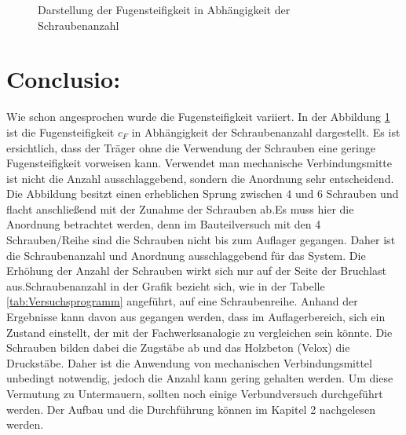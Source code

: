 \begin{figure}[h!]
\begin{center}
\caption{Darstellung der Fugensteifigkeit in Abhängigkeit der Schraubenanzahl}
\label{Fugensteifigkeit-Schraubenanzahl}
\end{center}
\end{figure}




\section{Conclusio:} Wie schon angesprochen wurde die Fugensteifigkeit variiert. In der Abbildung
\ref{Fugensteifigkeit-Schraubenanzahl} ist die Fugensteifigkeit $c_{F}$ in Abhängigkeit der Schraubenanzahl dargestellt.
Es ist ersichtlich, dass der Träger ohne die Verwendung der Schrauben eine geringe
Fugensteifigkeit vorweisen kann. Verwendet man mechanische Verbindungsmitte ist nicht die Anzahl ausschlaggebend, sondern die Anordnung sehr entscheidend. Die Abbildung besitzt einen erheblichen Sprung zwischen 4
und 6 Schrauben und flacht anschließend mit der Zunahme der Schrauben ab.Es muss hier die Anordnung betrachtet werden, denn im Bauteilversuch mit den 4 Schrauben/Reihe sind die Schrauben nicht bis zum Auflager gegangen. Daher ist die Schraubenanzahl und Anordnung ausschlaggebend für das System. Die Erhöhung der
Anzahl der Schrauben wirkt sich nur auf der Seite der Bruchlast aus.Schraubenanzahl
in der Grafik bezieht sich, wie in der Tabelle \ref{tab:Versuchsprogramm} angeführt, auf eine Schraubenreihe.
Anhand der Ergebnisse kann davon aus gegangen werden, dass im Auflagerbereich, sich
ein Zustand einstellt, der mit der Fachwerksanalogie zu vergleichen sein könnte. Die
Schrauben bilden dabei die Zugstäbe ab und das Holzbeton (Velox) die Druckstäbe. Daher ist die
Anwendung von mechanischen Verbindungsmittel unbedingt notwendig, jedoch die Anzahl kann gering gehalten werden. Um
diese Vermutung zu Untermauern, sollten noch einige Verbundversuch durchgeführt werden. Der Aufbau und die Durchführung können im Kapitel 2 nachgelesen werden.
